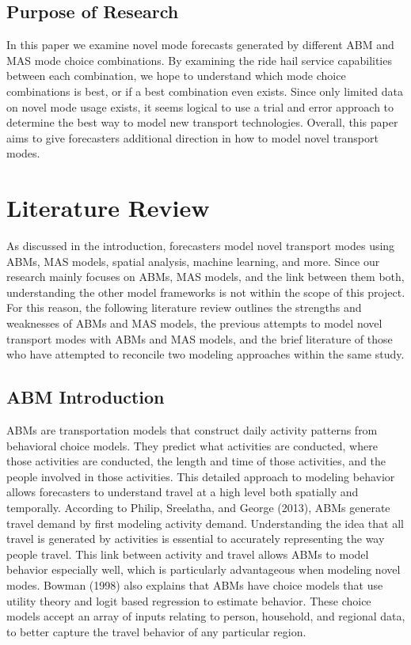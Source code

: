\documentclass[12pt, oneside, openright]{byuthesis}
\begin{document}
\hypertarget{purpose-of-research}{%
\section{Purpose of Research}\label{purpose-of-research}}

In this paper we examine novel mode forecasts generated by different ABM and MAS mode choice combinations. By examining the ride hail service capabilities between each combination, we hope to understand which mode choice combinations is best, or if a best combination even exists. Since only limited data on novel mode usage exists, it seems logical to use a trial and error approach to determine the best way to model new transport technologies. Overall, this paper aims to give forecasters additional direction in how to model novel transport modes.

\hypertarget{literature-review}{%
\chapter{Literature Review}\label{literature-review}}

As discussed in the introduction, forecasters model novel transport modes using ABMs, MAS models, spatial analysis, machine learning, and more. Since our research mainly focuses on ABMs, MAS models, and the link between them both, understanding the other model frameworks is not within the scope of this project. For this reason, the following literature review outlines the strengths and weaknesses of ABMs and MAS models, the previous attempts to model novel transport modes with ABMs and MAS models, and the brief literature of those who have attempted to reconcile two modeling approaches within the same study.

\hypertarget{abm-introduction}{%
\section{ABM Introduction}\label{abm-introduction}}

ABMs are transportation models that construct daily activity patterns from behavioral choice models. They predict what activities are conducted, where those activities are conducted, the length and time of those activities, and the people involved in those activities. This detailed approach to modeling behavior allows forecasters to understand travel at a high level both spatially and temporally. According to Philip, Sreelatha, and George (2013), ABMs generate travel demand by first modeling activity demand. Understanding the idea that all travel is generated by activities is essential to accurately representing the way people travel. This link between activity and travel allows ABMs to model behavior especially well, which is particularly advantageous when modeling novel modes. Bowman (1998) also explains that ABMs have choice models that use utility theory and logit based regression to estimate behavior. These choice models accept an array of inputs relating to person, household, and regional data, to better capture the travel behavior of any particular region.
\end{document}
